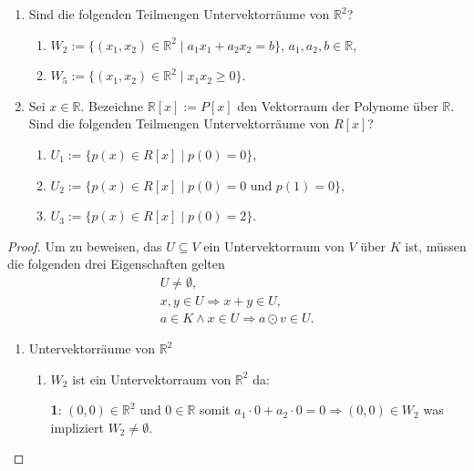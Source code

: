 \documentclass{../problemset}
\begin{document}
\pagebreak

\begin{problem}
\begin{enumerate}
	\item Sind die folgenden Teilmengen Untervektorräume von $\mathbb{R}^2$?
	      \begin{enumerate}[label=\alph*)]
		      \item $W_2 := \{(x_1, x_2) \in \mathbb{R}^2 \mid a_1x_1 + a_2x_2 = b\}$, $a_1, a_2, b \in \mathbb{R}$,
		      \item $W_5 := \{(x_1, x_2) \in \mathbb{R}^2 \mid x_1x_2 \geq 0\}$.
	      \end{enumerate}
	\item Sei $x \in \mathbb{R}$. Bezeichne $\mathbb{R}[x] := P[x]$ den Vektorraum der Polynome über $\mathbb{R}$.
	      Sind die folgenden Teilmengen Untervektorräume von $R[x]$?
	      \begin{enumerate}[label=\alph*)]
		      \item $U_1 := \{p(x) \in R[x] \mid p(0) = 0\}$,
		      \item $U_2 := \{p(x) \in R[x] \mid p(0) = 0 \text{ und } p(1) = 0\}$,
		      \item $U_3 := \{p(x) \in R[x] \mid p(0) = 2\}$.
	      \end{enumerate}
\end{enumerate}
\begin{proof}
	Um zu beweisen, das $U \subseteq V$ ein Untervektorraum von $V$ über $K$ ist, müssen die folgenden drei Eigenschaften gelten \begin{align}
		U \neq \emptyset,                       \\
		x, y \in U \Longrightarrow x + y \in U, \\
		a \in K \land x \in U \Longrightarrow a \odot v \in U.
	\end{align}

	\begin{enumerate}
		\item Untervektorräume von $\mathbb{R}^2$

		      \begin{enumerate}[label=\alph*)]
			      \item $W_2$ ist ein Untervektorraum von $\mathbb{R}^2$ da:

			            \textbf{1}: $(0, 0) \in \mathbb{R}^2$ und $0 \in \mathbb{R}$ somit $a_1 \cdot 0 + a_2 \cdot 0 = 0 \Longrightarrow (0, 0) \in W_2$ was impliziert $W_2 \neq \emptyset$. \checkmark


\end{enumerate}
\end{enumerate}
\end{proof}
\end{problem}
\end{document}
